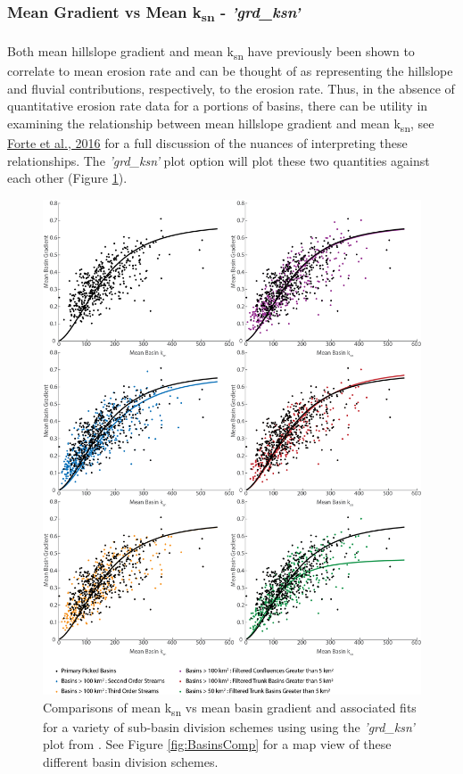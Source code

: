 \subsubsection{Mean Gradient vs Mean k\textsubscript{sn} - \textit{'grd\_ksn'}} \label{sec:grdksn}
\paragraph{}Both mean hillslope gradient and mean k\textsubscript{sn} have previously been shown to correlate to mean erosion rate and can be thought of as representing the hillslope and fluvial contributions, respectively, to the erosion rate. Thus, in the absence of quantitative erosion rate data for a portions of basins, there can be utility in examining the relationship between mean hillslope gradient and mean k\textsubscript{sn}, see \href{https://www.sciencedirect.com/science/article/pii/S0012821X16303004}{Forte et al., 2016} for a full discussion of the nuances of interpreting these relationships. The \textit{'grd\_ksn'} plot option will plot these two quantities against each other (Figure \ref{fig:GrdKsnComp}). 

\begin{figure}[H]
	\centering
	\includegraphics[width=15cm]{PNGs/grd_ksn_basinCompare.png}
	\caption{Comparisons of mean k\textsubscript{sn} vs mean basin gradient and associated fits  for a variety of sub-basin division schemes using  using the \textit{'grd\_ksn'} plot from . See Figure \ref{fig:BasinsComp} for a map view of these different basin division schemes.}
	\label{fig:GrdKsnComp}
\end{figure}


